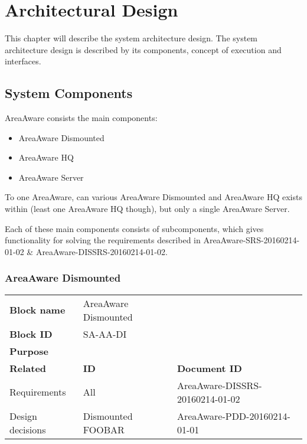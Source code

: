 
\thispagestyle{fancy}
\chapter{Architectural Design}
\label{chp:architectural}

This chapter will describe the system architecture design.
The system architecture design is described by its components, concept of execution and interfaces.


\section{System Components}
AreaAware consists the main components:
\begin{itemize}
\item AreaAware Dismounted
\item AreaAware HQ
\item AreaAware Server
\end{itemize}
To one AreaAware, can various AreaAware Dismounted and AreaAware HQ exists within (least one AreaAware HQ though), but only a single AreaAware Server.



\noindent Each of these main components consists of subcomponents, which gives functionality for solving the requirements described in  AreaAware-SRS-20160214-01-02 \&  AreaAware-DISSRS-20160214-01-02.


\subsection{AreaAware Dismounted}
\begin{tabular}{l|*{2}{l}}
    \textbf{Block name}     & AreaAware Dismounted \\
    \textbf{Block ID}       & SA-AA-DI \\
    \textbf{Purpose}        &  \\
    \hline
    \textbf{Related}    & \textbf{ID} & \textbf{Document ID} \\
    Requirements & All & AreaAware-DISSRS-20160214-01-02 \\
    Design decisions & Dismounted FOOBAR & AreaAware-PDD-20160214-01-01 \\
\end{tabular}\\\\

